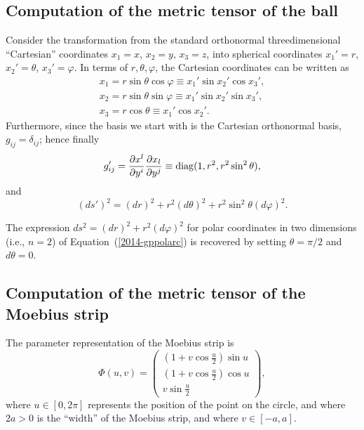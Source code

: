 {\subsection*{Computation of the metric tensor of the ball}
Consider the transformation from the standard orthonormal
threedimensional ``Cartesian'' coordinates
$x_1=x$,
$x_2=y$,
$x_3=z$,
into spherical coordinates
$x_1'=r$,
$x_2'=\theta$,
$x_3'=\varphi$.
In terms of  $r,\theta , \varphi$, the Cartesian coordinates can be written as
\begin{equation}
\begin{split}
 x_1=r \sin \theta \cos \varphi \equiv x_1' \sin x_2' \cos x_3'  , \\
 x_2=r \sin \theta \sin \varphi \equiv x_1'\sin x_2' \sin x_3'  ,    \\
 x_3=r \cos \theta  \equiv x_1'\cos x_2'  .
\end{split}
\end{equation}
Furthermore,  since the basis we start with is the Cartesian orthonormal basis,
$g_{ij}=\delta_{ij}$; hence finally
\begin{equation}
g'_{ij}= {\partial {x}^l\over \partial { y }^i}{\partial {x}_l\over \partial { y }^j}
\equiv {\rm diag}(1,r^2,r^2\sin^2 \theta ),
\end{equation}
and
\begin{equation}
(ds')^2 =(dr)^2+r^2(d\theta )^2+r^2\sin^2 \theta (d\varphi )^2.
\end{equation}

The expression $ds^2 =(dr)^2+r^2(d\varphi )^2$
for polar coordinates in two dimensions (i.e., $n=2$) of Equation~(\ref{2014-gppolarc})  is recovered by setting $\theta = \pi/2 $ and $d\theta =0$.

\subsection*{Computation of the metric tensor of the Moebius strip}
The parameter representation of the Moebius strip is
\begin{equation}
\Phi (u,v) =\left(
\begin{array}{c}
(1+v\cos \frac{u}{2})\sin u \\
(1+v\cos \frac{u}{2})\cos u \\
v\sin \frac{u}{2}
\end{array}
\right),
\end{equation}
where
$u\in [0,2\pi ]$ represents the position of the point on the circle,  and where $2a>0$ is the ``width'' of the Moebius strip,
and where $v\in [-a,a]$.


}
